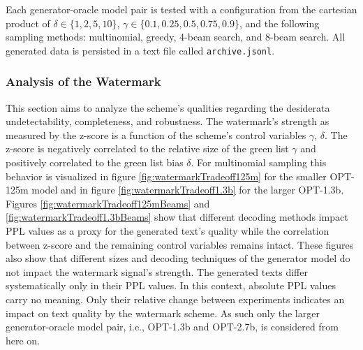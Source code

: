     Each generator-oracle model pair is tested with a configuration from the cartesian product of $\delta \in \{1,2,5,10\}$, $\gamma \in \{0.1,0.25,0.5,0.75,0.9\}$, and the following sampling methods: multinomial, greedy, 4-beam search, and 8-beam search.
    All generated data is persisted in a text file called \texttt{archive.jsonl}.
  
   	\subsubsection{Analysis of the Watermark}
	\label{sec:watermarkAnalysis}
    This section aims to analyze the scheme's qualities regarding the desiderata undetectability, completeness, and robustness.
	The watermark's strength as measured by the z-score is a function of the scheme's control variables $\gamma$, $\delta$.
    The z-score is negatively correlated to the relative size of the green list $\gamma$ and positively correlated to the green list bias $\delta$.
    For multinomial sampling this behavior is visualized in figure \ref{fig:watermarkTradeoff125m} for the smaller OPT-125m model and in figure \ref{fig:watermarkTradeoff1.3b} for the larger OPT-1.3b. 
    Figures \ref{fig:watermarkTradeoff125mBeams} and \ref{fig:watermarkTradeoff1.3bBeams} show that different decoding methods impact PPL values as a proxy for the generated text's quality while the correlation between z-score and the remaining control variables remains intact.
    These figures also show that different sizes and decoding techniques of the generator model do not impact the watermark signal's strength.
    The generated texts differ systematically only in their PPL values.
    In this context, absolute PPL values carry no meaning.
    Only their relative change between experiments indicates an impact on text quality by the watermark scheme.
    As such only the larger generator-oracle model pair, i.e., OPT-1.3b and OPT-2.7b, is considered from here on.

